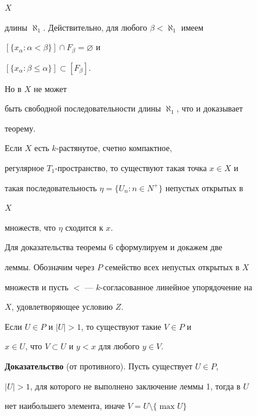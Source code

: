 $X$  


длины $\aleph_1$. Действительно, для любого $\beta<\aleph_1$ имеем  


$[\{x_\alpha:\alpha<\beta\}]\cap F_\beta=\varnothing$ и 


$[\{x_\alpha:\beta\le\alpha\}]\subset[F_\beta]$. 


Но в $X$ не может  


быть свободной последовательности длины $\aleph_1$, что и доказывает  


теорему. 


 


\begin{thm} 


Если $X$ есть $k$-растянутое, счетно компактное,  


регулярное $T_1$-пространство, то существуют такая точка $x\in X$ и  


такая последовательность $\eta=\{U_n:n\in N^+\}$ непустых открытых в 


$X$ 


множеств, что $\eta$ сходится к $x$. 


\end{thm} 


 


Для доказательства теоремы 6 сформулируем и докажем две  


леммы. Обозначим через $P$ семейство всех непустых открытых в $X$  


множеств и пусть $<$ --- $k$-согласованное линейное упорядочение на  


$X$, удовлетворяющее условию $Z$. 


 


\begin{lem} 


Если $U\in P$ и $|U|>1$, то существуют такие $V\in P$ и  


$x\in U$, что $V\subset U$ и $y<x$ для любого $y\in V$. 


\end{lem} 


 


{\bf Доказательство} (от противного). Пусть существует $U\in P$, 


$|U|>1$, для которого не выполнено заключение леммы 1, тогда в $U$  


нет наибольшего элемента, иначе $V=U\setminus\{\max U\}$ 


